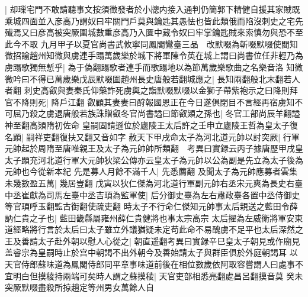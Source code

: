 |{
	却璅宅門不敢請聽事文按須徵發者於小牕内接入通判仍簡郭下精健自援其家賊既乘城四面並入彦高乃謂奴曰牢關門戶莫與鑰匙其愚怯也皆此類俄而陷沒刺史之宅先殱焉又曰彦高被突厥圍城數重彦高乃入匱中藏令奴曰牢掌鑰匙賊來索慎勿與恐不至此今不取}
九月甲子以夏官尚書武攸寧同鳳閣鸞臺三品　改默啜為斬啜默啜使閻知微招諭趙州知微與虜連手蹋萬歲樂於城下將軍陳令英在城上謂曰尚書位任非輕乃為虜蹋歌獨無慙乎|{
	為于偽翻蹋歌者連手而歌蹋地以為節萬歲樂歌曲之名樂音洛}
知微微吟曰不得已萬歲樂戊辰默啜圍趙州長史唐般若翻城應之|{
	長知兩翻般北末翻若人者翻}
刺史高叡與妻秦氏仰藥詐死虜輿之詣默啜默啜以金獅子帶紫袍示之曰降則拜官不降則死|{
	降戶江翻}
叡顧其妻妻曰酧報國恩正在今日遂俱閉目不言經再宿虜知不可屈乃殺之虜退唐般若族誅贈叡冬官尚書謚曰節叡熲之孫也|{
	冬官工部尚辰羊翻謚神至翻高熲隋初佐命}
皇嗣固請遜位於廬陵王太后許之壬申立廬陵王哲為皇太子復名顕|{
	嗣祥吏翻復扶又翻又音如字}
赦天下甲戌命太子為河北道元帥以討突厥|{
	行軍元帥起於周隋至唐唯親王及太子為元帥帥所類翻　考異曰實録云丙子據唐歷甲戌皇太子顕充河北道行軍大元帥狄梁公傳亦云皇太子為元帥以公為副是先立為太子後為元帥也今從新本紀}
先是募人月餘不滿千人|{
	先悉薦翻}
及聞太子為元帥應募者雲集未幾數盈五萬|{
	幾居豈翻}
戊寅以狄仁傑為河北道行軍副元帥右丞宋元爽為長史右臺中丞崔獻為司馬左臺中丞吉頊為監軍使|{
	后分御史臺為左右肅政臺各置中丞侍御史等官頊呼玉翻監古衘翻使疏吏翻}
時太子不行命仁傑知元帥事太后親送之藍田令薛訥仁貴之子也|{
	藍田畿縣屬雍州薛仁貴健將也事太宗高宗}
太后擢為左威衛將軍安東道經略將行言於太后曰太子雖立外議猶疑未定苟此命不易醜虜不足平也太后深然之王及善請太子赴外朝以慰人心從之|{
	朝直遥翻考異曰實録辛巳皇太子朝見或作廟見盖睿宗為皇嗣時止於宫中朝謁不出外朝今及善始請太子與群臣俱於外庭朝謁耳}
以天官侍郎蘇味道為鳳閣侍郎同平章事味道前後在相位數歲依阿取容嘗謂人曰處事不宜明白但摸稜持兩端可矣時人謂之蘇摸稜|{
	天官吏部相悉亮翻處昌呂翻摸音莫}
癸未突厥默啜盡殺所掠趙定等州男女萬餘人自

